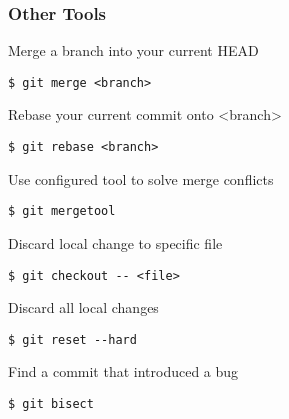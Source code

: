 \begin{multicols}{2}
\subsubsection*{Other Tools}
Merge a branch into your current HEAD
\begin{lstlisting}
$ git merge <branch>
\end{lstlisting}
Rebase your current commit onto <branch>
\begin{lstlisting}
$ git rebase <branch>
\end{lstlisting}
Use configured tool to solve merge conflicts
\begin{lstlisting}
$ git mergetool
\end{lstlisting}
Discard local change to specific file
\begin{lstlisting}
$ git checkout -- <file>
\end{lstlisting}
Discard all local changes
\begin{lstlisting}
$ git reset --hard
\end{lstlisting}
Find a commit that introduced a bug
\begin{lstlisting}
$ git bisect
\end{lstlisting}

\end{multicols}


%
